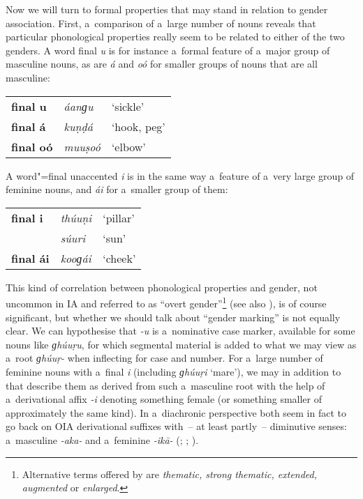 Now we will turn to formal properties that may stand in relation to gender association. First, a~comparison of a~large number of nouns reveals that particular phonological properties really seem to be related to either of the two genders. A word final \textit{u} is for instance a~formal feature of a~major group of masculine nouns, as are \textit{á} and \textit{oó} for smaller groups of nouns that are all masculine:



\begin{table}[H]
\begin{tabularx}{\textwidth}{ l l l }
\textbf{final u} &
\textit{áanɡu} &
`sickle'\\
\textbf{final á} &
\textit{kuṇḍá} &
`hook, peg'\\
\textbf{final oó} &
\textit{muuṣoó} &
`elbow'\\
\end{tabularx}
\end{table}

A word"=final unaccented \textit{i} is in the same way a~feature of a~very large group of feminine nouns, and \textit{ái} for a~smaller group of them:


\begin{table}[H]
\begin{tabularx}{\textwidth}{ l l l }
\textbf{final i} &
\textit{thúuṇi} &
`pillar'\\
&
\textit{súuri} &
`sun'\\
\textbf{final ái} &
\textit{kooɡái} &
`cheek'\\
\end{tabularx}
\end{table}

This kind of correlation between phonological properties and gender, not uncommon in IA \citep[219]{masica1991} and referred to as ``overt gender''\footnote{Alternative terms offered by \citet[219]{masica1991} are \textit{thematic, strong thematic, extended, augmented} or \textit{enlarged}.} (see also \citealt[44, 62]{corbett1991}), is of course significant, but whether we should talk about ``gender marking'' is not equally clear. We can hypothesise that \textit{-u} is a~nominative case marker, available for some nouns like \textit{ɡhúuṛu}, for which segmental material is added to what we may view as a~root \textit{ɡhúuṛ-} when inflecting for case and number. For a~large number of feminine nouns with a~final \textit{i} (including \textit{ɡhúuṛi} `mare'), we may in addition to that describe them as derived from such a~masculine root with the help of a~derivational affix \textit{-i} denoting something female (or something smaller of approximately the same kind). In a~diachronic perspective both seem in fact to go back on OIA derivational suffixes with~-- at least partly~-- diminutive senses: a~masculine \textit{-aka-} and a~feminine \textit{-ikā-} (\citealt[222]{masica1991}; \citealt[15]{morgenstierne1941}; \citealt[29]{buddruss1967}).


